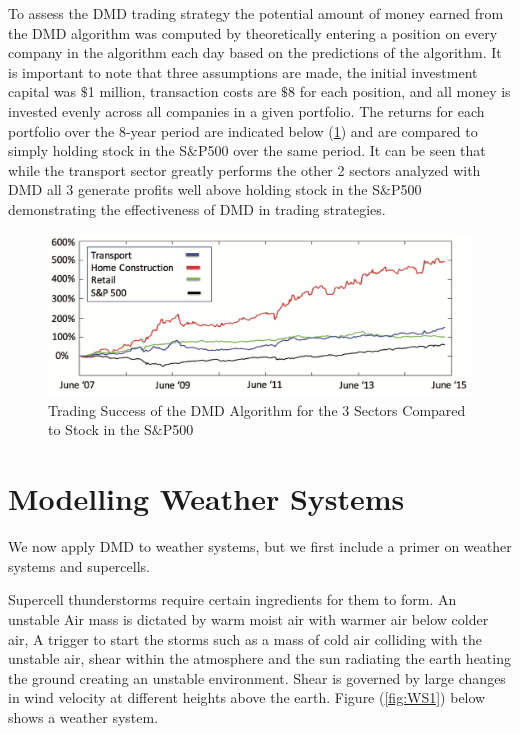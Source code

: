 \documentclass[12pt]{report}
\begin{document}
To assess the DMD trading strategy the potential amount of money earned from the DMD algorithm was computed by theoretically entering a position on every company in the algorithm each day based on the predictions of the algorithm. It is important to note that three assumptions are made, the initial investment capital was $\$$1 million, transaction costs are $\$$8 for each position, and all money is invested evenly across all companies in a given portfolio. The returns for each portfolio over the 8-year period are indicated below (\ref{fig:FSucc}) and are compared to simply holding stock in the S$\&$P500 over the same period. It can be seen that while the transport sector greatly performs the other 2 sectors analyzed with DMD all 3 generate profits well above holding stock in the S$\&$P500 demonstrating the effectiveness of DMD in trading strategies.

\begin{figure}[H]
    \centering
    \includegraphics[width=1\textwidth]{Application pics/MA680 (F) Money.png}
    \caption{Trading Success of the DMD Algorithm for the 3 Sectors Compared to Stock in the S$\&$P500} \label{fig:FSucc}
\end{figure}
\noindent

\section{Modelling Weather Systems}

We now apply DMD to weather systems, but we first include a primer on weather systems and supercells.  

Supercell thunderstorms require certain ingredients for them to form. An
unstable Air mass is dictated by warm moist air with warmer air below colder
air, A trigger to start the storms such as a mass of cold air colliding
with the unstable air, shear within the atmosphere and the sun radiating the earth heating the ground creating an unstable environment. Shear is
governed by large changes in wind velocity at different heights above the
earth. Figure (\ref{fig:WS1}) below shows a weather system.
\end{document}
